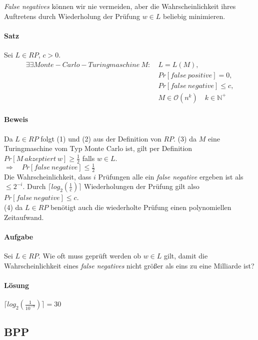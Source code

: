 \emph{False negatives} können wir nie vermeiden, aber die Wahrscheinlichkeit ihres Auftretens durch Wiederholung der Prüfung $w \in L$ beliebig minimieren.

\paragraph{Satz}
Sei $L \in RP$, $c > 0$.
\setcounter{equation}{0}
\begin{alignat}
	\exists \exists Monte-Carlo-Turingmaschine\ M:\ 
	& L = L(M), \\
	& Pr[false\ positive] = 0, \\
	& Pr[false\ negative] \leq c, \\
	& M \in \mathcal{O}(n^k) \quad k \in \mathbb{N}^+ 
\end{alignat}

\paragraph{Beweis}
Da $L \in RP$ folgt (1) und (2) aus der Definition von $RP$.
(3) da $M$ eine Turingmaschine vom Typ Monte Carlo ist, gilt per Definition $Pr[M\ akzeptiert\ w] \geq \frac{1}{2}$ falls $w \in L$. \\
$\Rightarrow \quad Pr[false\ negative] \leq \frac{1}{2}$ \\
Die Wahrscheinlichkeit, dass $i$ Prüfungen alle ein \emph{false negative} ergeben ist als $\leq 2^{-i}$. 
Durch $\lceil log_{2}(\frac{1}{c}) \rceil$ Wiederholungen der Prüfung gilt also $Pr[false\ negative] \leq c$. \\
(4) da $L \in RP$ benötigt auch die wiederholte Prüfung einen polynomiellen Zeitaufwand.

\paragraph{Aufgabe}
Sei $L \in RP$. Wie oft muss geprüft werden ob $w \in L$ gilt, damit die Wahrscheinlichkeit eines \emph{false negatives} nicht größer als eins zu eine Milliarde ist?

\paragraph{Lösung}
$\lceil log_{2}(\frac{1}{10^{-9}}) \rceil = 30$

\subsection{BPP}
